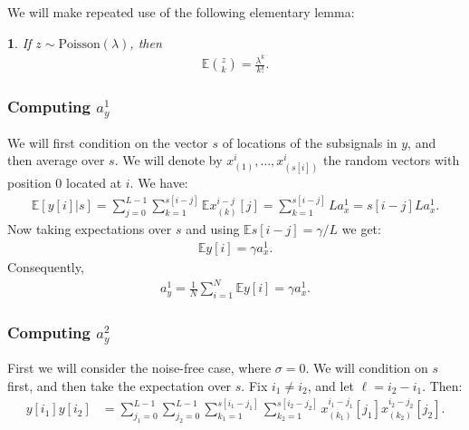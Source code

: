 \documentclass[12pt]{article}
\newcommand{\E}{\mathbb{E}}
\newcommand{\1}{\mathbf{1}}
\newcommand{\Poisson}{\text{Poisson}}
\theoremstyle{plain}
\theoremstyle{definition}
\theoremstyle{remark}
\theoremstyle{plain}
\newtheorem{lem}[thm]{\protect\lemmaname}
\theoremstyle{remark}
\theoremstyle{plain}
\theoremstyle{plain}
\theoremstyle{plain}
\providecommand{\lemmaname}{Lemma}
\numberwithin{equation}{section}
\begin{document}
We will make repeated use of the following elementary lemma:
%
\begin{lem} \label{lem-choose}
	If $z \sim \Poisson(\lambda)$, then 
	\begin{align}
	\E {z\choose k} = \frac{\lambda^k}{k!}.
	\end{align}
\end{lem}


%



\subsubsection{Computing $a_y^1$}

We will first condition on the vector $s$ of locations of the subsignals in $y$, and then average over $s$. We will denote by $x_{(1)}^i,\dots,x_{(s[i])}^i$ the random vectors with position 0 located at $i$. We have:
%
\begin{align}
%
\E[ y[i] | s ] = \sum_{j=0}^{L-1} \sum_{k=1}^{s[i-j]} \E x_{(k)}^{i-j}[j]
= \sum_{k=1}^{s[i-j]} L a_x^1
= s[i-j] L a_x^1.
%
\end{align}
%
Now taking expectations over $s$ and using $\E s[i-j] = \gamma/L$ we get:
%
\begin{align}
%
\E y[i] = \gamma a_x^1.
%
\end{align}
%
Consequently,
%
\begin{align}
a_y^1 = \frac{1}{N} \sum_{i=1}^N \E y[i] = \gamma a_x^1.
\end{align}


%


\subsubsection{Computing $a_y^2$}

First we will consider the noise-free case, where $\sigma = 0$. We will condition on $s$ first, and then take the expectation over $s$. Fix $i_1 \ne i_2$, and let $\ell = i_2 - i_1$. Then:
%
\begin{align}
%
y[i_1] y[i_2]
&= \sum_{j_1=0}^{L-1} \sum_{j_2=0}^{L-1} 
\sum_{k_1=1}^{s[i_1-j_1]}\sum_{k_2=1}^{s[i_2-j_2]}
x_{(k_1)}^{i_1-j_1}[j_1] x_{(k_2)}^{i_2 - j_2}[j_2].
%
\end{align}
\end{document}
